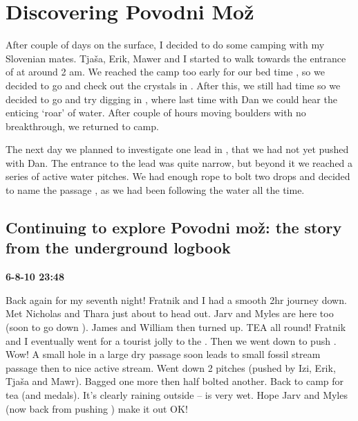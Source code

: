 

\section{Discovering Povodni Mož}


After couple of days on the surface, I decided to do some camping with
my Slovenian mates. Tjaša, Erik, Mawer and I started to walk towards the
entrance of  at around 2 am. We reached the camp too
early for our bed time
, so we
decided to go and check out the crystals in .
After this, we still had time so we decided to go and try digging in
, where last time with Dan we could hear the
enticing `roar' of water. After couple of hours moving boulders with no
breakthrough, we returned to camp.


The next day we planned to investigate one lead in , that we had not yet pushed with Dan. The entrance to the lead
was quite narrow, but beyond it we reached a series of active water
pitches. We had enough rope to bolt two drops and decided to name the
passage  , as we had been
following the water all the time.


\subsection{Continuing to explore Povodni mož: the story from the underground logbook}

\textbf{6-8-10 23:48}

Back again for my seventh night! Fratnik and I had a smooth 2hr journey
down. Met Nicholas and Thara just about to head out. Jarv and Myles are
here too (soon to go down ). James and William then turned up. TEA
all round! Fratnik and I eventually went for a tourist jolly to the
. Then we went down to push . Wow! A small
hole in a large dry passage soon leads to small fossil stream passage
then to nice active stream. Went down 2 pitches (pushed by Izi, Erik,
Tjaša and Mawr). Bagged one more then half bolted another. Back to camp
for tea (and medals). It's clearly raining outside --  is
very wet. Hope Jarv and Myles (now back from pushing ) make it out
OK!

